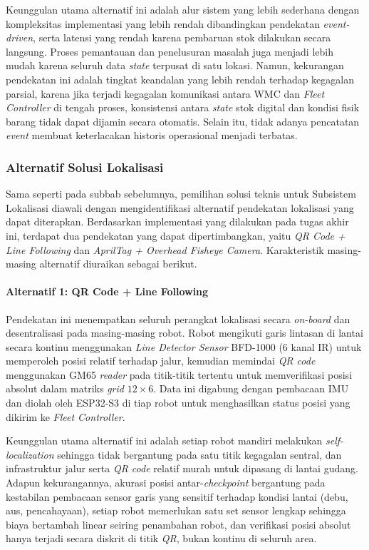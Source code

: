 Keunggulan utama alternatif ini adalah alur sistem yang lebih sederhana dengan kompleksitas implementasi yang lebih rendah dibandingkan pendekatan \textit{event-driven}, serta latensi yang rendah karena pembaruan stok dilakukan secara langsung. Proses pemantauan dan penelusuran masalah juga menjadi lebih mudah karena seluruh data \textit{state} terpusat di satu lokasi. Namun, kekurangan pendekatan ini adalah tingkat keandalan yang lebih rendah terhadap kegagalan parsial, karena jika terjadi kegagalan komunikasi antara WMC dan \textit{Fleet Controller} di tengah proses, konsistensi antara \textit{state} stok digital dan kondisi fisik barang tidak dapat dijamin secara otomatis. Selain itu, tidak adanya pencatatan \textit{event} membuat keterlacakan historis operasional menjadi terbatas.

\subsubsection{Alternatif Solusi Lokalisasi}
\label{sec:alternatif-solusi-lokalisasi}
Sama seperti pada subbab sebelumnya, pemilihan solusi teknis untuk Subsistem Lokalisasi diawali dengan mengidentifikasi alternatif pendekatan lokalisasi yang dapat diterapkan. Berdasarkan implementasi yang dilakukan pada tugas akhir ini, terdapat dua pendekatan yang dapat dipertimbangkan, yaitu \textit{QR Code + Line Following} dan \textit{AprilTag + Overhead Fisheye Camera}. Karakteristik masing-masing alternatif diuraikan sebagai berikut.

\paragraph{Alternatif 1: QR Code + Line Following}

Pendekatan ini menempatkan seluruh perangkat lokalisasi secara \textit{on-board} dan desentralisasi pada masing-masing robot. Robot mengikuti garis lintasan di lantai secara kontinu menggunakan \textit{Line Detector Sensor} BFD-1000 (6 kanal IR) untuk memperoleh posisi relatif terhadap jalur, kemudian memindai \textit{QR code} menggunakan GM65 \textit{reader} pada titik-titik tertentu untuk memverifikasi posisi absolut dalam matriks \textit{grid} $12\times6$. Data ini digabung dengan pembacaan IMU dan diolah oleh ESP32-S3 di tiap robot untuk menghasilkan status posisi yang dikirim ke \textit{Fleet Controller}.

Keunggulan utama alternatif ini adalah setiap robot mandiri melakukan \textit{self-localization} sehingga tidak bergantung pada satu titik kegagalan sentral, dan infrastruktur jalur serta \textit{QR code} relatif murah untuk dipasang di lantai gudang. Adapun kekurangannya, akurasi posisi antar-\textit{checkpoint} bergantung pada kestabilan pembacaan sensor garis yang sensitif terhadap kondisi lantai (debu, aus, pencahayaan), setiap robot memerlukan satu set sensor lengkap sehingga biaya bertambah linear seiring penambahan robot, dan verifikasi posisi absolut hanya terjadi secara diskrit di titik \textit{QR}, bukan kontinu di seluruh area.

